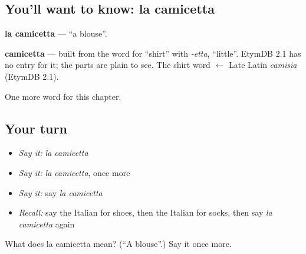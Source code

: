 \subsection*{You'll want to know: la camicetta}
\textbf{la camicetta} — \textquotedblleft{}a blouse\textquotedblright{}.

\begin{cousinweb}
\textbf{camicetta} — built from the word for \textquotedblleft{}shirt\textquotedblright{} with \emph{-etta}, \textquotedblleft{}little\textquotedblright{}. EtymDB 2.1 has no entry for it; the parts are plain to see. The shirt word $\leftarrow$ Late Latin \emph{camisia} (EtymDB 2.1).
\end{cousinweb}

\begin{grammarlens}[title={What you've built}]
One more word for this chapter.
\end{grammarlens}

\subsection*{Your turn}
\begin{itemize}
\raggedright
  \item \emph{Say it:} \emph{la camicetta}
  \item \emph{Say it:} \emph{la camicetta}, once more
  \item \emph{Say it:} say \emph{la camicetta}
  \item \emph{Recall:} say the Italian for shoes, then the Italian for socks, then say \emph{la camicetta} again
\end{itemize}

\begin{tcolorbox}[breakable,colback=teal!4,colframe=teal!35!black,title={Before you move on}]
What does la camicetta mean? (\textquotedblleft{}A blouse\textquotedblright{}.) Say it once more.
\end{tcolorbox}
